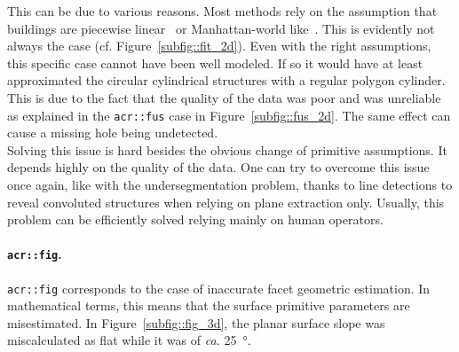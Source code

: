                 This can be due to various reasons.
                Most methods rely on the assumption that buildings are piecewise linear~\parencite{nan2017polyfit} or Manhattan-world like~\parencite{li2016manhattan}.
                This is evidently not always the case (cf. Figure~\ref{subfig::fit_2d}).
                Even with the right assumptions, this specific case cannot have been well modeled.
                If so it would have at least approximated the circular cylindrical structures with a regular polygon cylinder.
                This is due to the fact that the quality of the data was poor and was unreliable as explained in the \texttt{\gls{acr::fus}} case in Figure~\ref{subfig::fus_2d}.
                The same effect can cause a missing hole being undetected.\\

                Solving this issue is hard besides the obvious change of primitive assumptions.
                It depends highly on the quality of the data.
                One can try to overcome this issue once again, like with the undersegmentation problem, thanks to line detections to reveal convoluted structures when relying on plane extraction only.
                Usually, this problem can be efficiently solved relying mainly on human operators.

            \paragraph{\texttt{\acrlong*{acr::fig}}.}
                \texttt{\gls{acr::fig}} corresponds to the case of inaccurate facet geometric estimation.
                In mathematical terms, this means that the surface primitive parameters are misestimated.
                In Figure~\ref{subfig::fig_3d}, the planar surface slope was miscalculated as flat while it was of \textit{ca.} \SI{25}{\degree}.\\

